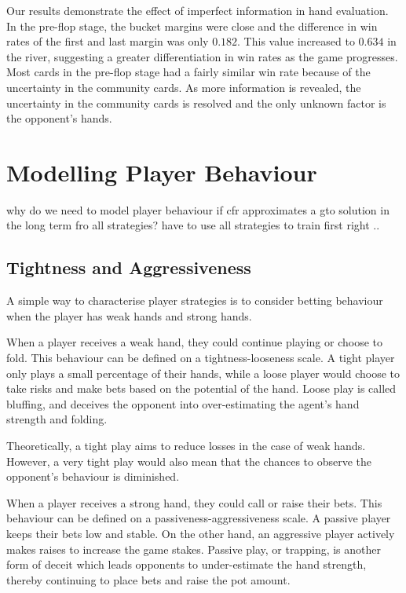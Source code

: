 \documentclass{article}
\begin{document}
Our results demonstrate the effect of imperfect information in hand evaluation. In the pre-flop stage, the bucket margins were close and the difference in win rates of the first and last margin was only $0.182$. This value increased to $0.634$ in the river, suggesting a greater differentiation in win rates as the game progresses. Most cards in the pre-flop stage had a fairly similar win rate because of the uncertainty in the community cards. As more information is revealed, the uncertainty in the community cards is resolved and the only unknown factor is the opponent's hands.


\section{Modelling Player Behaviour}
why do we need to model player behaviour if cfr approximates a gto solution in the long term fro all strategies? have to use all strategies to train first right ..

\subsection{Tightness and Aggressiveness}
A simple way to characterise player strategies is to consider betting behaviour when the player has weak hands and strong hands. 

When a player receives a weak hand, they could continue playing or choose to fold. This behaviour can be defined on a tightness-looseness scale. A tight player only plays a small percentage of their hands, while a loose player would choose to take risks and make bets based on the potential of the hand. Loose play is called bluffing, and deceives the opponent into over-estimating the agent's hand strength and folding.

Theoretically, a tight play aims to reduce losses in the case of weak hands. However, a very tight play would also mean that the chances to observe the opponent's behaviour is diminished.

When a player receives a strong hand, they could call or raise their bets. This behaviour can be defined on a passiveness-aggressiveness scale. A passive player keeps their bets low and stable. On the other hand, an aggressive player actively makes raises to increase the game stakes. Passive play, or trapping, is another form of deceit which leads opponents to under-estimate the hand strength, thereby continuing to place bets and raise the pot amount.
\end{document}
